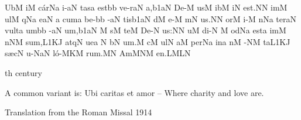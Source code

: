 \bigskip
\goodbreak
\filbreak


\Internote
\nosolesmescustos
\initiumgregorianum
{}%
\sgn {}Ub\punctum M\egn
\sgn {}i{}\punctum M\egn
\spatium
\sgn c{\'a}r\pes Na\egn
\sgn {}i-\clivis aN\egn
\sgn tas\punctum a\egn
\spatium
\sgn {}e{st}\bmolle b\punctum b\egn
\spatium
\sgn ve{-r}\clivis aN\egn
\sgn {}a,\episem b1\clivis aN\egn
\spatium
\divisiominima
\spatium
\sgn D{e}-\punctum M\egn
\sgn {}us\punctum M\egn
\spatium
\sgn {}ib\punctum M\egn
\sgn {}i{}\punctum N\egn
\spatium
\sgn {}e{st.}\punctum N\augmentum N\egn
\spatium
\divisiofinalis
\spatium
{}im\punctum M\egn
\sgn {}ul\punctum M\egn
\spatium
{}q\pes Na\egn
{}e{}\clivis aN\egn
\custos a
\lineaproxima
\spatium
\sgn cum\punctum a\egn
\spatium
\sgn be-\bmolle b\punctum b\egn
{}-\clivis aN\egn
\sgn tis\episem b1\clivis aN\egn
\spatium
\divisiominima
\spatium
{}d\punctum M\egn
\sgn {}e-\punctum M\egn
\spatium
{}m\punctum N\egn
\sgn {}u{s.}\punctum N\augmentum N\egn
\spatium
\divisiofinalis
\spatium
{}or\punctum M\egn
\sgn {}i-\punctum M\egn
{}n\pes Na\egn
\sgn ter\clivis aN\egn
\spatium
\sgn v{u}{lt}\punctum a\egn
\sgn {}um\bmolle b\punctum b\egn
\spatium
{}-\clivis aN\egn
\sgn {}u{m,}\episem b1\clivis aN\egn
\spatium
\divisiominima
\spatium
\custos M
\lineaproxima
{}s\punctum M\egn
\sgn te{}\punctum M\egn
\spatium
\sgn D{e}-\punctum N\egn
\sgn {}u{s:}\punctum N\augmentum N\egn
\spatium
\divisiofinalis
\spatium
{}u\punctum M\egn
\sgn di-\punctum N\egn
{}\punctum M\egn
\spatium
{}od\pes Na\egn
\spatium
\sgn {}e{st}\punctum a\egn
\spatium
\sgn {}im\punctum M\egn
{}n\clivis NM\egn
\sgn su{m,}\episem L1\clivis KJ\egn
\spatium
\sgn {}a{tq}\punctum N\egn
\sgn ue{}\punctum a\egn
\spatium
\custos N
\lineaproxima
{}b\engl{}\punctum N\egn
\sgn {}u{m.}\punctum M\egn
\spatium
\divisiofinalis
\spatium
{}c\punctum M\egn
\sgn {}ul\punctum N\egn
\sgn {}a{}\punctum M\egn
\spatium
\sgn per\pes Na\egn
\spatium
\sgn {}in\punctum a\egn
{}n\punctum M\egn
\sgn {}{\'\i}-\clivis NM\egn
\sgn ta{}\episem L1\clivis KJ\egn
\spatium
\sgn s{\ae}c\punctum N\egn
\sgn {}u-\torculus NaN\egn
\sgn l{\'o}-\porrectus MKM\egn
\sgn ru{m.}\punctum M\augmentum N\egn
\spatium
\divisiofinalis
\spatium
\sgn {}Am\torculus MNM\egn
\sgn {}e{n.}\pes LM\augmentumduplex LN\egn
\spatium
\Finisgregoriana

\bigskip

\medskip

th century

\source A common variant is: Ubi caritas et amor -- Where charity and love are.

\source Translation from the Roman Missal 1914

